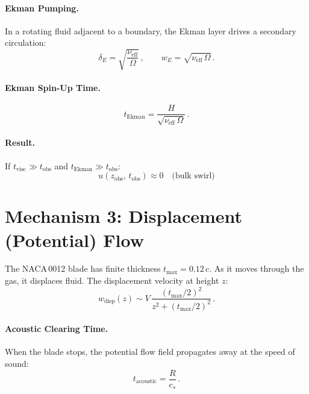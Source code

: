 \documentclass[11pt,a4paper]{article}
\begin{document}
\paragraph{Ekman Pumping.}
In a rotating fluid adjacent to a boundary, the Ekman layer drives a
secondary circulation:
\begin{equation}
  \delta_E = \sqrt{\frac{\nu_\mathrm{eff}}{\Omega}}\,,
  \qquad
  w_E = \sqrt{\nu_\mathrm{eff}\,\Omega}\,.
  \label{eq:Ekman}
\end{equation}

\paragraph{Ekman Spin-Up Time.}
\begin{equation}
  t_\mathrm{Ekman} = \frac{H}{\sqrt{\nu_\mathrm{eff}\,\Omega}}\,.
  \label{eq:tEkman}
\end{equation}

\paragraph{Result.}
If $t_\mathrm{visc} \gg t_\mathrm{obs}$ and $t_\mathrm{Ekman} \gg t_\mathrm{obs}$:
\begin{equation}
  \boxed{u(z_\mathrm{obs},\, t_\mathrm{obs}) \approx 0
    \quad \text{(bulk swirl)}}
\end{equation}


\section{Mechanism 3: Displacement (Potential) Flow}
\label{sec:potential}

The NACA\,0012 blade has finite thickness $t_\mathrm{max} = 0.12\,c$. As
it moves through the gas, it displaces fluid. The displacement velocity
at height $z$:
\begin{equation}
  w_\mathrm{disp}(z)
    \sim V \,\frac{(t_\mathrm{max}/2)^2}{z^2 + (t_\mathrm{max}/2)^2}\,.
  \label{eq:wdisp}
\end{equation}

\paragraph{Acoustic Clearing Time.}
When the blade stops, the potential flow field propagates away at the
speed of sound:
\begin{equation}
  t_\mathrm{acoustic} = \frac{R}{c_s}\,.
  \label{eq:tacoustic}
\end{equation}
\end{document}

